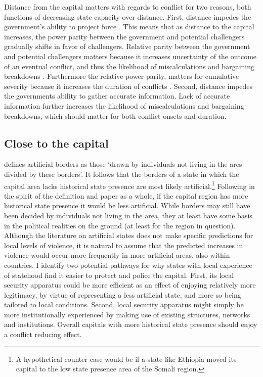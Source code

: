 \documentclass[12pt]{article}
\begin{document}
Distance from the capital matters with regards to conflict for two reasons, both
functions of decreasing state capacity over distance. First, distance impedes
the government's ability to project force \citep{Boulding1963, Buhaug_2010,
Buhaug2009, Herbst2014}. This means that as distance to the capital increases,
the power parity between the government and potential challengers gradually
shifts in favor of challengers. Relative parity between the government and
potential challengers matters because it increases uncertainty of the outcome of
an eventual conflict, and thus the likelihood of miscalculations and bargaining
breakdowns \citep{Boulding1963, Buhaug_2010}. Furthermore the relative power
parity, matters for cumulative severity because it increases the duration of
conflicts \citep{Buhaug2009}. Second, distance impedes the governments ability
to gather accurate information. Lack of accurate information further increases
the likelihood of miscalculations and bargaining breakdowns, which should matter
for both conflict onsets and duration.

\subsection{Close to the capital} \label{Close}

\citet{Alesina2011} defines artificial borders as those `drawn by individuals
not living in the ares divided by these borders'. It follows that the borders of
a state in which the capital area lacks historical state presence are most
likely artificial.\footnote{A hypothetical counter case would be if a state like
Ethiopia moved its capital to the low state presence area of the Somali region.}
Following in the spirit of the definition and paper as a whole, if the capital
region has more historical state presence it would be less artificial. While
borders may still have been decided by individuals not living in the area, they
at least have some basis in the political realities on the ground (at least for
the region in question). Although the literature on artificial states does not
make specific predictions for local levels of violence, it is natural to assume
that the predicted increases in violence would occur more frequently in more
artificial areas, also within countries. I identify two potential pathways for
why states with local experience of statehood find it easier to protect and
police the capital. First, its local security apparatus could be more efficient
as an effect of enjoying relatively more legitimacy, by virtue of representing a
less artificial state, and more so being tailored to local conditions. Second,
local security apparatus might simply be more institutionally experienced by
making use of existing structures, networks and institutions. Overall capitals
with more historical state presence should enjoy a conflict reducing effect.
\end{document}
